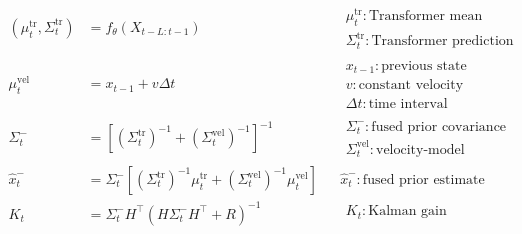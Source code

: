 \documentclass[a4paper]{article}
\title{}
\date{}
\begin{document}
    \maketitle
    \[
        \begin{aligned}
            (\mu^{\mathrm{tr}}_{t},\Sigma^{\mathrm{tr}}_{t})
            &=
            f_{\theta}(X_{t-L:t-1})
            &&
            \begin{array}{l}
                \mu^{\mathrm{tr}}_{t}: \text{Transformer mean prediction} \\
                \Sigma^{\mathrm{tr}}_{t}: \text{Transformer prediction covariance}
            \end{array}
            \\[8pt]
            \mu^{\mathrm{vel}}_{t}
            &=
            x_{t-1}
            +
            v\Delta t
            &&
            \begin{array}{l}
                x_{t-1}: \text{previous state} \\
                v: \text{constant velocity} \\
                \Delta t: \text{time interval}
            \end{array}
            \\[8pt]
            \Sigma^{-}_{t}
            &=
            \left[
                (\Sigma^{\mathrm{tr}}_{t})^{-1}
                +
                (\Sigma^{\mathrm{vel}}_{t})^{-1}
            \right]^{-1}
            &&
            \begin{array}{l}
                \Sigma^{-}_{t}: \text{fused prior covariance} \\
                \Sigma^{\mathrm{vel}}_{t}: \text{velocity-model covariance}
            \end{array}
            \\[8pt]
            \hat{x}^{-}_{t}
            &=
            \Sigma^{-}_{t}
            \left[
                (\Sigma^{\mathrm{tr}}_{t})^{-1}\mu^{\mathrm{tr}}_{t}
                +
                (\Sigma^{\mathrm{vel}}_{t})^{-1}\mu^{\mathrm{vel}}_{t}
            \right]
            &&
            \hat{x}^{-}_{t}: \text{fused prior estimate}
            \\[8pt]
            K_{t}
            &=
            \Sigma^{-}_{t}H^{\top}
            \left(
                H\Sigma^{-}_{t}H^{\top}
                +
                R
            \right)^{-1}
            &&
            \begin{array}{l}
                K_{t}: \text{Kalman gain} \\

\end{array}
\end{aligned}\]
\end{document}
